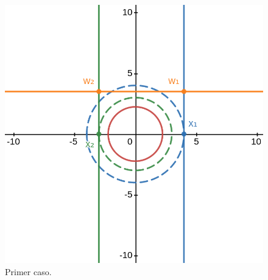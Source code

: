 \documentclass{scrartcl}
\begin{document}
\begin{figure}
    \begin{center}
        \includegraphics[width=.65\textwidth]{caso1.png}
    \end{center}
    \caption{Primer caso.}
\end{figure}


\end{document}
